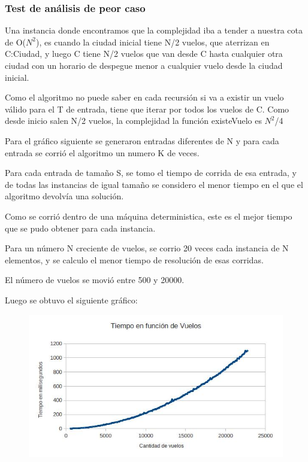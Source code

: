 \subsubsection{Test de an\'alisis de peor caso}

Una instancia donde encontramos que la complejidad iba a tender a nuestra cota de O($N^{2}$), es cuando  la ciudad inicial tiene N/2 vuelos, que aterrizan en C:Ciudad, y luego C tiene N/2 vuelos que van desde C hasta cualquier otra ciudad con un horario de despegue menor a cualquier vuelo desde la ciudad inicial.

Como el algoritmo no puede saber en cada recursi\'on si va a existir un vuelo v\'alido para el T de entrada, tiene que iterar por todos los vuelos de C. Como desde inicio salen N/2 vuelos, la complejidad la funci\'on existeVuelo es $N^{2}$/4

Para el gr\'afico siguiente se generaron entradas diferentes de N y para cada entrada se corri\'o el algoritmo un numero K de veces.

Para cada entrada de tamaño S, se tomo el tiempo de corrida de esa entrada, y de todas las instancias de igual tamaño se considero el menor tiempo en el que el algoritmo devolv\'ia una soluci\'on.

Como se corri\'o dentro de una m\'aquina deterministica, este es el mejor tiempo que se pudo obtener para cada instancia. 

Para un n\'umero N creciente de vuelos, se corrio 20 veces cada instancia de N elementos, y se calculo el menor tiempo de resoluci\'on de esas corridas.

El n\'umero de vuelos se movi\'o entre 500 y 20000.

Luego se obtuvo el siguiente gr\'afico:

\newpage
\begin{figure}[ht]
	\begin{minipage}[t]{\linewidth}
		\centering
		\includegraphics[width=\textwidth]{GraficoDeVuelosYTiempo.jpg}
	\end{minipage}	
\end{figure}

